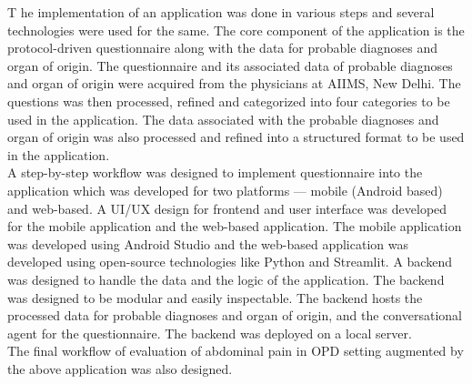 \lettrine{T}{ }he implementation of an application was done in various steps and several technologies were used for the same. The core component of the application is the protocol-driven questionnaire along with the data for probable diagnoses and organ of origin. The questionnaire and its associated data of probable diagnoses and organ of origin were acquired from the physicians at AIIMS, New Delhi. The questions was then processed, refined and categorized into four categories to be used in the application. The data associated with the probable diagnoses and organ of origin was also processed and refined into a structured format to be used in the application.\\[\baselineskip]

\noindent A step-by-step workflow was designed to implement questionnaire into the application which was developed for two platforms --- mobile (Android based) and web-based. A UI/UX design for frontend and user interface was developed for the mobile application and the web-based application. The mobile application was developed using Android Studio and the web-based application was developed using open-source technologies like Python and Streamlit. A backend was designed to handle the data and the logic of the application. The backend was designed to be modular and easily inspectable. The backend hosts the processed data for probable diagnoses and organ of origin, and the conversational agent for the questionnaire. The backend was deployed on a local server. \\[\baselineskip]

\noindent The final workflow of evaluation of abdominal pain in OPD setting augmented by the above application was also designed. 
